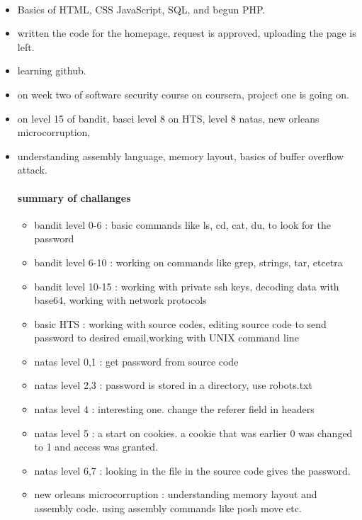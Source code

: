 \documentclass{article}
\begin{document}
\begin{itemize}
\paragraph{}
\begin{itemize}
    \item Basics of HTML, CSS JavaScript, SQL, and begun PHP.
    \item written the code for the homepage, request is approved, uploading the page is left.
    \item learning github. 
    \item on week two of software security course on coursera, project one is going on.
    \item on level 15 of bandit, basci level 8 on HTS, level 8 natas, new orleans microcorruption, 
    \item understanding assembly language, memory layout, basics of buffer overflow attack. 
        \paragraph{summary of challanges} 
        \begin{itemize}
            \item bandit level 0-6 : basic commands like ls, cd, cat, du, to look for the password
            \item bandit level 6-10 : working on commands like grep, strings, tar, etcetra
            \item bandit level 10-15 : working with private ssh keys, decoding data with base64, working with network protocols
            \item basic HTS : working with source codes, editing source code to send password to desired email,working with UNIX command line
            \item natas level 0,1 : get password from source code
            \item natas level 2,3 : password is stored in a directory, use robots.txt
            \item natas level 4 : interesting one. change the referer field in headers
            \item natas level 5 : a start on cookies. a cookie that was earlier 0 was changed to 1 and access was granted.
            \item natas level 6,7 : looking in the file in the source code gives the password. 
            \item new orleans microcorruption : understanding memory layout and assembly code. using assembly commands like posh move etc. 

\end{itemize}
\end{itemize}
\end{itemize}
\end{document}
